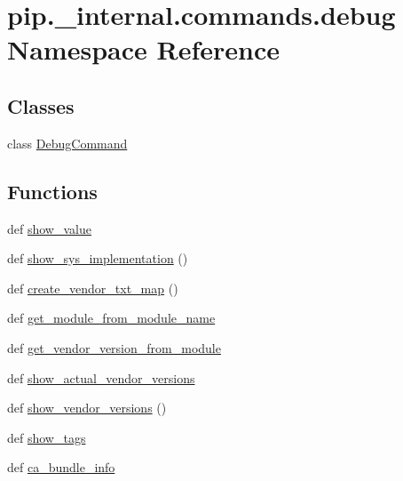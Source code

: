 \hypertarget{namespacepip_1_1__internal_1_1commands_1_1debug}{}\section{pip.\+\_\+internal.\+commands.\+debug Namespace Reference}
\label{namespacepip_1_1__internal_1_1commands_1_1debug}
\subsection*{Classes}
\begin{DoxyCompactItemize}
\item 
class \hyperlink{classpip_1_1__internal_1_1commands_1_1debug_1_1DebugCommand}{Debug\+Command}
\end{DoxyCompactItemize}
\subsection*{Functions}
\begin{DoxyCompactItemize}
\item 
def \hyperlink{namespacepip_1_1__internal_1_1commands_1_1debug_ac8b926ef5fabeed51f8f5d1a60fb8b46}{show\+\_\+value}
\item 
def \hyperlink{namespacepip_1_1__internal_1_1commands_1_1debug_a07a4f79f7d87301a97d34fbeebf06691}{show\+\_\+sys\+\_\+implementation} ()
\item 
def \hyperlink{namespacepip_1_1__internal_1_1commands_1_1debug_ae3f1f7e00838d5dd7867b91d68c4dd9e}{create\+\_\+vendor\+\_\+txt\+\_\+map} ()
\item 
def \hyperlink{namespacepip_1_1__internal_1_1commands_1_1debug_a9eef029a13070ee15d395cafdfcc3811}{get\+\_\+module\+\_\+from\+\_\+module\+\_\+name}
\item 
def \hyperlink{namespacepip_1_1__internal_1_1commands_1_1debug_a877e981a16ac2d207a4cecad2c71700a}{get\+\_\+vendor\+\_\+version\+\_\+from\+\_\+module}
\item 
def \hyperlink{namespacepip_1_1__internal_1_1commands_1_1debug_abc3c4c61ede64e415a838d302b9540a2}{show\+\_\+actual\+\_\+vendor\+\_\+versions}
\item 
def \hyperlink{namespacepip_1_1__internal_1_1commands_1_1debug_a872ca30fb17574d3220321f398c8cc8a}{show\+\_\+vendor\+\_\+versions} ()
\item 
def \hyperlink{namespacepip_1_1__internal_1_1commands_1_1debug_a7ace39a109e987400305e8e86935293f}{show\+\_\+tags}
\item 
def \hyperlink{namespacepip_1_1__internal_1_1commands_1_1debug_aef86e35fd38fb8689b69881b6ab257dc}{ca\+\_\+bundle\+\_\+info}
\end{DoxyCompactItemize}
